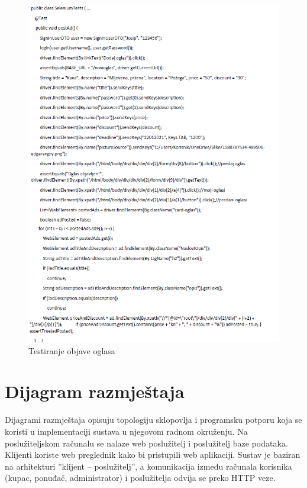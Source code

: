 			\begin{figure}[H]
				\includegraphics[scale=0.9]{slike/sel5.PNG} %
				\centering
				\caption{Testiranje objave oglasa}
				\label{fig:sel5}
			\end{figure}
			
			\eject 
			
			\section{Dijagram razmještaja}
		
		Dijagrami razmještaja opisuju topologiju sklopovlja i programsku potporu koja se koristi u implementaciji sustava u njegovom radnom okruženju. Na poslužiteljskom računalu se nalaze web poslužitelj i poslužitelj baze podataka. Klijenti koriste web preglednik kako bi pristupili web aplikaciji. Sustav je baziran na arhitekturi ”klijent – poslužitelj”, a komunikacija između računala korisnika (kupac, ponuđač, administrator) i poslužitelja odvija se preko HTTP veze. 
		
